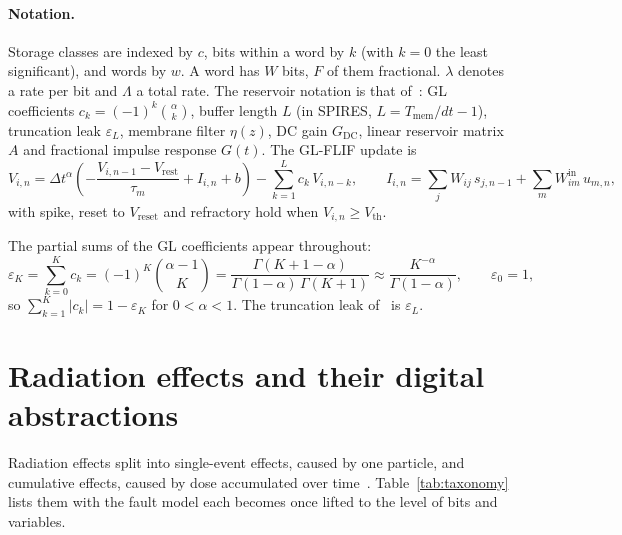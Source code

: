 \documentclass[11pt,a4paper]{article}
\newcommand{\dta}{\Delta t^{\alpha}}
\begin{document}
\paragraph{Notation.} Storage classes are indexed by $c$, bits within a word by $k$ (with $k=0$ the least significant), and words by $w$. A word has $W$ bits, $F$ of them fractional. $\lambda$ denotes a rate per bit and $\Lambda$ a total rate. The reservoir notation is that of~\cite{dropout2026}: GL coefficients $c_k = (-1)^k\binom{\alpha}{k}$, buffer length $L$ (in SPIRES, $L = T_{\mathrm{mem}}/dt - 1$), truncation leak $\varepsilon_L$, membrane filter $\eta(z)$, DC gain $G_{\mathrm{DC}}$, linear reservoir matrix $A$ and fractional impulse response $G(t)$. The GL-FLIF update is
\begin{equation}
V_{i,n} = \dta\left( -\frac{V_{i,n-1} - V_{\mathrm{rest}}}{\tau_m} + I_{i,n} + b \right) - \sum_{k=1}^{L} c_k \, V_{i,n-k},
\qquad
I_{i,n} = \sum_j W_{ij}\, s_{j,n-1} + \sum_m W^{\mathrm{in}}_{im}\, u_{m,n},
\label{eq:glflif}
\end{equation}
with spike, reset to $V_{\mathrm{reset}}$ and refractory hold when $V_{i,n} \ge V_{\mathrm{th}}$.

The partial sums of the GL coefficients appear throughout:
\begin{equation}
\varepsilon_K = \sum_{k=0}^{K} c_k = (-1)^K\binom{\alpha-1}{K} = \frac{\Gamma(K+1-\alpha)}{\Gamma(1-\alpha)\,\Gamma(K+1)} \approx \frac{K^{-\alpha}}{\Gamma(1-\alpha)},
\qquad \varepsilon_0 = 1,
\label{eq:epsK}
\end{equation}
so $\sum_{k=1}^{K} |c_k| = 1 - \varepsilon_K$ for $0 < \alpha < 1$. The truncation leak of~\cite{dropout2026} is $\varepsilon_L$.

\section{Radiation effects and their digital abstractions}
\label{sec:taxonomy}

Radiation effects split into single-event effects, caused by one particle, and cumulative effects, caused by dose accumulated over time~\cite{petersen2011,dodd2003,baumann2005}. Table~\ref{tab:taxonomy} lists them with the fault model each becomes once lifted to the level of bits and variables.
\end{document}
